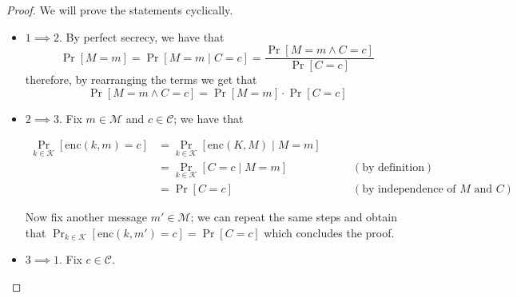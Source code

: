 \documentclass[a4paper, 12pt]{report}
\begin{document}
\begin{proof}
	We will prove the statements cyclically.

	\begin{itemize}
		\item $1 \implies 2$. By perfect secrecy, we have that $$\Pr[M = m] = \Pr[M = m \mid C = c] = \dfrac{\Pr[M = m \land C = c]}{\Pr[C = c]}$$ therefore, by rearranging the terms we get that $$\Pr[M = m \land C = c] = \Pr[M = m] \cdot \Pr[C = c]$$
		\item $2 \implies 3$. Fix $m \in \mathcal M$ and $c \in \mathcal C$; we have that

		      \begin{equation*}
			      \begin{alignedat}{2}
				      \Pr_{k \in \mathcal K}[\mathrm{enc}(k, m) = c] & = \Pr_{k \in \mathcal K}[\mathrm{enc}(K, M) \mid M = m] &                                                     \\
				                                                     & = \Pr_{k \in \mathcal K}[C = c \mid M = m]              & \quad \quad (\mbox{by definition})                  \\
				                                                     & = \Pr[C = c]                                            & \quad \quad (\mbox{by independence of $M$ and $C$})
			      \end{alignedat}
		      \end{equation*}

		      Now fix another message $m' \in \mathcal M$; we can repeat the same steps and obtain that $\Pr_{k \in \mathcal K}[\mathrm{enc}(k, m') = c] = \Pr[C = c]$ which concludes the proof.
		\item $3 \implies 1$. Fix $c \in \mathcal C$.

\end{itemize}
\end{proof}
\end{document}

